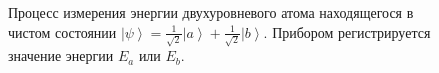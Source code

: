 \begin{figure}
\centering



\caption{Процесс измерения энергии двухуровневого атома находящегося в
чистом состоянии $\left|\psi\right> = 
\frac{1}{\sqrt{2}}\left|a\right> + \frac{1}{\sqrt{2}}\left|b\right>$.
Прибором регистрируется значение энергии $E_a$ или $E_b$.
}
\label{fig:add:mesure_ex}
\end{figure}
